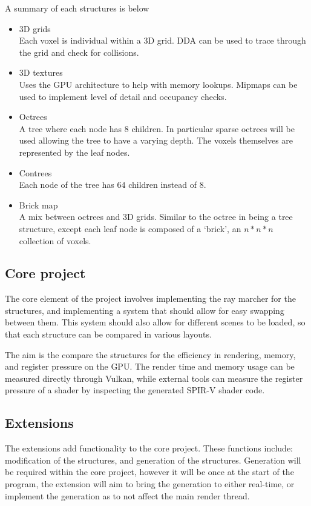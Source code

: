 A summary of each structures is below
\begin{itemize}
  \item 3D grids \\
    Each voxel is individual within a 3D grid. DDA can be used to
    trace through the grid and check for collisions.
  \item 3D textures \\
    Uses the GPU architecture to help with memory lookups. Mipmaps
    can be used to implement level of detail and occupancy checks.
  \item Octrees \\
    A tree where each node has 8 children. In particular sparse octrees will be
    used allowing the tree to have a varying depth. The voxels themselves are
    represented by the leaf nodes.
  \item Contrees \\
    Each node of the tree has $64$ children instead of $8$.
  \item Brick map \\
    A mix between octrees and 3D grids. Similar to the octree in
    being a tree structure, except each leaf node is composed of a `brick', an
    $n*n*n$ collection of voxels.
\end{itemize}

\subsection*{Core project}
The core element of the project involves implementing the ray marcher
for the structures, and implementing a system that should allow
for easy swapping between them. This system should also allow for different
scenes to be loaded, so that each structure can be compared in various layouts.

The aim is the compare the structures for the efficiency in
rendering, memory, and register pressure
on the GPU. The render time and memory usage can be measured directly
through Vulkan, while external tools can measure the register
pressure of a shader by inspecting the generated SPIR-V shader code.

\subsection*{Extensions}
The extensions add functionality to the core project. These functions include:
modification of the structures, and generation of the structures.
Generation will be required within the core project, however it will
be once at the start of the program, the extension will aim to bring
the generation to either real-time, or implement the generation as to
not affect the main render thread.


